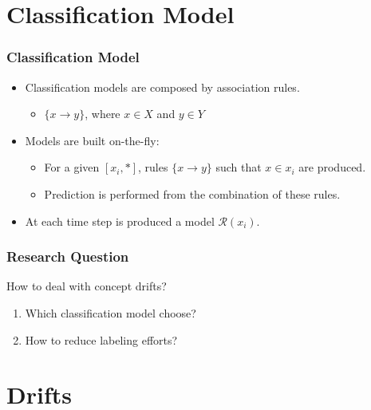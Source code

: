 \documentclass[14pt]{beamer}
\begin{document}
\section{Classification Model}
\begin{frame}\frametitle{Classification Model}
\begin{itemize}
\item Classification models are composed by association rules.
  \begin{itemize}
    \item $\{x \to y\}$, where $x \in X$ and $y \in Y$
  \end{itemize}
\item Models are built on-the-fly:
  \begin{itemize}
    \item For a given $[x_i, *]$, rules $\{x \to y\}$ such that $x \in x_i$ are produced.
    \item Prediction is performed from the combination of these rules.
  \end{itemize}
\item At each time step is produced a model $\mathcal{R}(x_i)$.
\end{itemize}
\end{frame}

\begin{frame}\frametitle{Research Question}

\centering
\large{\alert{How to deal with concept drifts?}}
\vspace{0.5in}
\small{\begin{enumerate}
\item Which classification model choose?
\item How to reduce labeling efforts?
\end{enumerate}}
\end{frame}

\section{Drifts}
\end{document}
